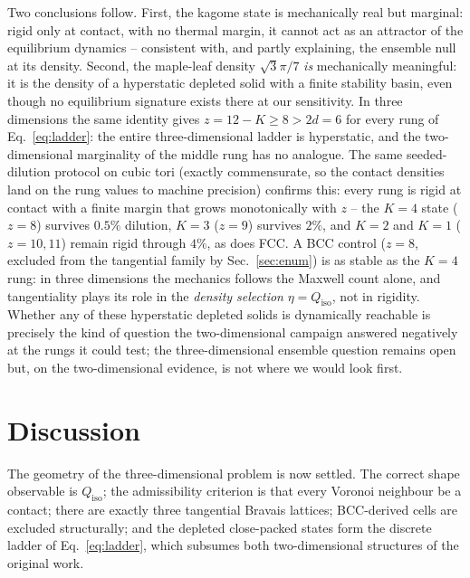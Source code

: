 \documentclass[11pt]{article}
\begin{document}
Two conclusions follow. First, the kagome state is mechanically real but
marginal: rigid only at contact, with no thermal margin, it cannot act as
an attractor of the equilibrium dynamics -- consistent with, and partly
explaining, the ensemble null at its density. Second, the maple-leaf
density $\sqrt{3}\pi/7$ \emph{is} mechanically meaningful: it is the
density of a hyperstatic depleted solid with a finite stability basin,
even though no equilibrium signature exists there at our sensitivity. In
three dimensions the same identity gives $z=12-K\geq8>2d=6$ for every
rung of Eq.~\eqref{eq:ladder}: the entire three-dimensional ladder is
hyperstatic, and the two-dimensional marginality of the middle rung has no
analogue. The same seeded-dilution protocol on cubic tori (exactly
commensurate, so the contact densities land on the rung values to machine
precision) confirms this: every rung is rigid at contact with a finite
margin that grows monotonically with $z$ -- the $K{=}4$ state ($z{=}8$)
survives $0.5\%$ dilution, $K{=}3$ ($z{=}9$) survives $2\%$, and $K{=}2$
and $K{=}1$ ($z{=}10,11$) remain rigid through $4\%$, as does FCC. A BCC
control ($z{=}8$, excluded from the tangential family by
Sec.~\ref{sec:enum}) is as stable as the $K{=}4$ rung: in three dimensions
the mechanics follows the Maxwell count alone, and tangentiality plays its
role in the \emph{density selection} $\eta=Q_{\mathrm{iso}}$, not in
rigidity. Whether any of these hyperstatic depleted solids is dynamically
reachable is precisely the kind of question the two-dimensional campaign
answered negatively at the rungs it could test; the three-dimensional
ensemble question remains open but, on the two-dimensional evidence, is not
where we would look first.

\section{Discussion}
\label{sec:disc}

The geometry of the three-dimensional problem is now settled. The correct shape
observable is $Q_{\mathrm{iso}}$; the admissibility criterion is that every
Voronoi neighbour be a contact; there are exactly three tangential Bravais
lattices; BCC-derived cells are excluded structurally; and the depleted
close-packed states form the discrete ladder of Eq.~\eqref{eq:ladder}, which
subsumes both two-dimensional structures of the original work.
\end{document}
